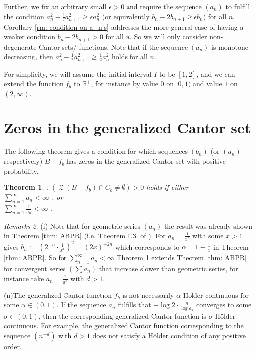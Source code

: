 \documentclass[11pt,reqno]{amsart}
\theoremstyle{plain}
\newtheorem{theorem}{Theorem}[section]
\theoremstyle{definition}
\theoremstyle{remark}
\newtheorem{remarks}[theorem]{Remarks}
\begin{document}
Further, we fix an arbitrary small $\epsilon > 0$ and require the sequence $(a_n)$ to fulfill the condition
$a_n^2 - \frac{1}{2}a_{n+1}^2 \geq \epsilon a_n^2$ (or equivalently $b_n- 2b_{n+1} \geq \epsilon b_n$) for all $n$. Corollary \ref{rm: condition on a_n's} addresses the more general case of having a weaker condition $b_n- 2b_{n+1} > 0$ for all $n$. So we will only consider non-degenerate Cantor sets/ functions. Note that if the sequence $(a_n)$ is monotone decreasing, then $a_n^2 - \frac{1}{2}a_{n+1}^2 \geq \frac{1}{2} a_n^2$ holds for all $n$.

For simplicity, we will assume the initial interval $I$ to be $[1,2]$, and we can extend the function $f_{b}$ to $\mathbb{R}^+$, for instance by value $0$ on $[0,1)$ and value $1$ on $(2,\infty)$. 

\section{Zeros in the generalized Cantor set}\label{Zeros in the Cantor set}

The following theorem gives a condition for which sequences $(b_n)$ (or $(a_n)$ respectively) $B-f_b$ has zeros in the generalized Cantor set with positive probability.

\begin{theorem}\label{thm:cantorset-zeros2}
$\mathbb{P}(\operatorname{\mathcal{Z}}(B-f_b) \cap C_b \neq \emptyset)>0$ holds if either
\\$\sum_{n=1}^{\infty} a_n < \infty$
, or
\\$\sum_{n=1}^{\infty} \frac{1}{a_n} < \infty$
.
\end{theorem}

\begin{remarks}
(i) Note that for geometric series $(a_n)$ the result was already shown in Theorem \ref{thm: ABPR} (i.e. Theorem 1.3. of \cite{ABPR}). For $a_n = \frac{1}{x^{n}}$ with some $x>1$ gives $b_{n}:= (2^{-n} \cdot \frac{1}{x^{n}})^2 = (2x)^{-2n}$ which corresponds to $\alpha = 1- \frac{1}{x}$ in Theorem \ref{thm: ABPR}. So for $\sum_{n=1}^{\infty} a_n < \infty$ Theorem \ref{thm:cantorset-zeros2} extends Theorem \ref{thm: ABPR} for convergent series $(\sum a_n)$ that increase slower than geometric series, for instance take $a_n = \frac{1}{n^d}$ with $d>1$.

(ii)The generalized Cantor function $f_b$ is not necessarily $\alpha$-{H\"{o}lder } continuous for some $\alpha \in (0,1)$. If the sequence $a_n$ fulfills that $-\log 2 \cdot \frac{n}{\log a_n}$ converges to some $\sigma \in (0,1)$, then the corresponding generalized Cantor function is $\sigma$-{H\"{o}lder } continuous. For example, the generalized Cantor function corresponding to the sequence $(n^{-d})$ with $d>1$ does not satisfy a {H\"{o}lder } condition of any positive order.

\end{remarks}
\end{document}

